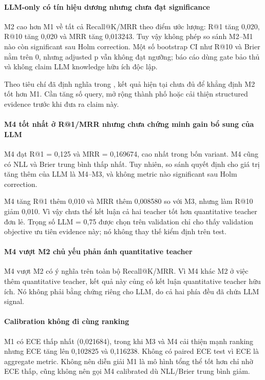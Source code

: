 \paragraph{LLM-only có tín hiệu dương nhưng chưa đạt significance}

M2 cao hơn M1 về tất cả Recall@K/MRR theo điểm ước lượng: R@1 tăng 0,020, R@10 tăng 0,020 và MRR tăng 0,013243. Tuy vậy không phép so sánh M2--M1 nào còn significant sau Holm correction. Một số bootstrap CI như R@10 và Brier nằm trên 0, nhưng adjusted p vẫn không đạt ngưỡng; báo cáo dùng gate bảo thủ và không claim LLM knowledge hữu ích độc lập.

Theo tiêu chí đã định nghĩa trong , kết quả hiện tại chưa đủ để khẳng định M2 tốt hơn M1. Cần tăng số query, mở rộng thành phố hoặc cải thiện structured evidence trước khi đưa ra claim này.

\paragraph{M4 tốt nhất ở R@1/MRR nhưng chưa chứng minh gain bổ sung của LLM}

M4 đạt R@1 = 0,125 và MRR = 0,169674, cao nhất trong bốn variant. M4 cũng có NLL và Brier trung bình thấp nhất. Tuy nhiên, so sánh quyết định cho giá trị tăng thêm của LLM là M4--M3, và không metric nào significant sau Holm correction.

M4 tăng R@1 thêm 0,010 và MRR thêm 0,008580 so với M3, nhưng làm R@10 giảm 0,010. Vì vậy chưa thể kết luận cả hai teacher tốt hơn quantitative teacher đơn lẻ. Trọng số LLM = 0,75 được chọn trên validation chỉ cho thấy validation objective ưu tiên evidence này; nó không thay thế kiểm định trên test.

\paragraph{M4 vượt M2 chủ yếu phản ánh quantitative teacher}

M4 vượt M2 có ý nghĩa trên toàn bộ Recall@K/MRR. Vì M4 khác M2 ở việc thêm quantitative teacher, kết quả này củng cố kết luận quantitative teacher hữu ích. Nó không phải bằng chứng riêng cho LLM, do cả hai phía đều đã chứa LLM signal.

\paragraph{Calibration không đi cùng ranking}

M1 có ECE thấp nhất (0,021684), trong khi M3 và M4 cải thiện mạnh ranking nhưng ECE tăng lên 0,102825 và 0,116238. Không có paired ECE test vì ECE là aggregate metric. Không nên diễn giải M1 là mô hình tổng thể tốt hơn chỉ nhờ ECE thấp, cũng không nên gọi M4 calibrated dù NLL/Brier trung bình giảm.

